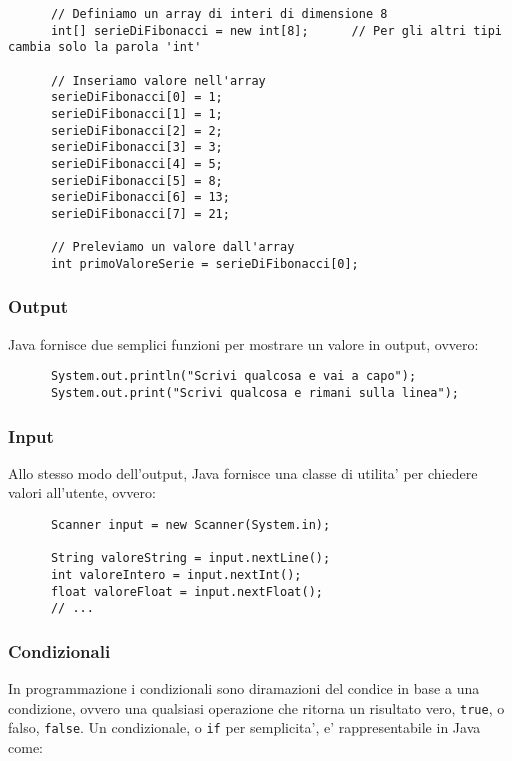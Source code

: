 \documentclass{article}
\begin{document}
{    \begin{verbatim}
      // Definiamo un array di interi di dimensione 8
      int[] serieDiFibonacci = new int[8];      // Per gli altri tipi cambia solo la parola 'int'

      // Inseriamo valore nell'array
      serieDiFibonacci[0] = 1;
      serieDiFibonacci[1] = 1;
      serieDiFibonacci[2] = 2;
      serieDiFibonacci[3] = 3;
      serieDiFibonacci[4] = 5;
      serieDiFibonacci[5] = 8;
      serieDiFibonacci[6] = 13;
      serieDiFibonacci[7] = 21;

      // Preleviamo un valore dall'array
      int primoValoreSerie = serieDiFibonacci[0];
    \end{verbatim}

    \subsubsection{Output}
    Java fornisce due semplici funzioni per mostrare un valore in output, ovvero:

    \begin{verbatim}
      System.out.println("Scrivi qualcosa e vai a capo");
      System.out.print("Scrivi qualcosa e rimani sulla linea");
    \end{verbatim}

    \subsubsection{Input}
    Allo stesso modo dell'output, Java fornisce una classe di utilita' per chiedere valori all'utente, ovvero:

    \begin{verbatim}
      Scanner input = new Scanner(System.in);

      String valoreString = input.nextLine();
      int valoreIntero = input.nextInt();
      float valoreFloat = input.nextFloat();
      // ...
    \end{verbatim}

    \subsubsection{Condizionali}
    In programmazione i condizionali sono diramazioni del condice in base a una condizione, ovvero una qualsiasi operazione che ritorna un risultato vero, \texttt{true}, o falso, \texttt{false}. Un condizionale, o \texttt{if} per semplicita', e' rappresentabile in Java come:

}
\end{document}
